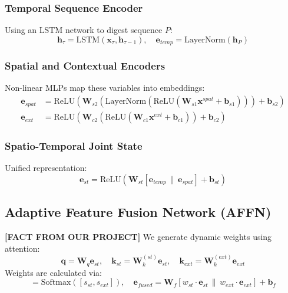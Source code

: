 \documentclass[conference]{IEEEtran}
\begin{document}
\subsubsection{Temporal Sequence Encoder}
Using an LSTM network to digest sequence $P$:
\begin{equation}
\mathbf{h}_\tau = \text{LSTM}(\mathbf{x}_\tau, \mathbf{h}_{\tau-1}), \quad \mathbf{e}_{temp} = \text{LayerNorm}(\mathbf{h}_P)
\end{equation}

\subsubsection{Spatial and Contextual Encoders}
Non-linear MLPs map these variables into embeddings:
\begin{align}
\mathbf{e}_{spat} &= \text{ReLU}\left(\mathbf{W}_{s2} \left(\text{LayerNorm}(\text{ReLU}(\mathbf{W}_{s1} \mathbf{x}^{spat} + \mathbf{b}_{s1}))\right) + \mathbf{b}_{s2}\right) \\
\mathbf{e}_{ext} &= \text{ReLU}\left(\mathbf{W}_{c2} \left(\text{ReLU}(\mathbf{W}_{c1} \mathbf{x}^{ext} + \mathbf{b}_{c1})\right) + \mathbf{b}_{c2}\right)
\end{align}

\subsubsection{Spatio-Temporal Joint State}
Unified representation:
\begin{equation}
\mathbf{e}_{st} = \text{ReLU}\left( \mathbf{W}_{st} [\mathbf{e}_{temp} \,\|\, \mathbf{e}_{spat}] + \mathbf{b}_{st} \right)
\end{equation}

\subsection{Adaptive Feature Fusion Network (AFFN)}
\noindent \textbf{[FACT FROM OUR PROJECT]} We generate dynamic weights using attention:
\begin{equation}
\mathbf{q} = \mathbf{W}_q \mathbf{e}_{st}, \quad \mathbf{k}_{st} = \mathbf{W}_k^{(st)} \mathbf{e}_{st}, \quad \mathbf{k}_{ext} = \mathbf{W}_k^{(ext)} \mathbf{e}_{ext}
\end{equation}
Weights are calculated via:
\begin{equation}
[w_{st}, w_{ext}] = \text{Softmax}([s_{st}, s_{ext}]), \quad \mathbf{e}_{fused} = \mathbf{W}_f [w_{st} \cdot \mathbf{e}_{st} \,\|\, w_{ext} \cdot \mathbf{e}_{ext}] + \mathbf{b}_f
\end{equation}
\end{document}
